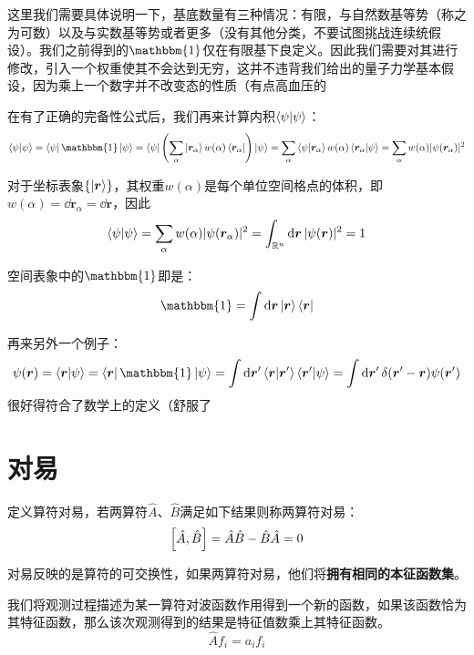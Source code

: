 这里我们需要具体说明一下，基底数量有三种情况：有限，与自然数基等势（称之为可数）以及与实数基等势或者更多（没有其他分类，不要试图挑战连续统假设）。我们之前得到的$\mathbbm{1}$仅在有限基下良定义。因此我们需要对其进行修改，引入一个权重使其不会达到无穷，这并不违背我们给出的量子力学基本假设，因为乘上一个数字并不改变态的性质（有点高血压的

在有了正确的完备性公式后，我们再来计算内积$\bra{\psi}\ket{\psi}$：
\[\bra{\psi}\ket{\psi}=\bra{\psi}\mathbbm{1}\ket{\psi}=\bra{\psi}\left(\sum_{\alpha}\ket{\bm{r}_{\alpha}}w(\alpha)\bra{\bm{r}_{\alpha}}\right)\ket{\psi}=\sum_{\alpha}\bra{\psi}\ket{\bm{r}_{\alpha}}w(\alpha)\bra{\bm{r}_{\alpha}}\ket{\psi}=\sum_{\alpha}w(\alpha)|\psi(\bm{r}_{\alpha})|^2\]

对于坐标表象$\{\ket{\bm{r}}\}$，其权重$w(\alpha)$是每个单位空间格点的体积，即$w(\alpha)=\dd{\bm{r}_{\alpha}}=\dd{\bm{r}}$，因此
\[\bra{\psi}\ket{\psi}=\sum_{\alpha}w(\alpha)|\psi(\bm{r}_{\alpha})|^2=\int_{\mathbb{R}^n}\dd{\bm{r}}|\psi(\bm{r})|^2=1\]

空间表象中的$\mathbbm{1}$即是：
\[\mathbbm{1}=\int\dd{\bm{r}}\ket{\bm{r}}\bra{\bm{r}}\]

再来另外一个例子：
\[\psi(\bm{r})=\bra{\bm{r}}\ket{\psi}=\bra{\bm{r}}\mathbbm{1}\ket{\psi}=\int\dd{\bm{r}'}\bra{\bm{r}}\ket{\bm{r}'}\bra{\bm{r}'}\ket{\psi}=\int\dd{\bm{r}'}\delta(\bm{r}'-\bm{r})\psi(\bm{r}')\]
很好得符合了数学上的定义（舒服了


\section{对易}
定义算符对易，若两算符$\hat{A}$、$\hat{B}$满足如下结果则称两算符对易：
\[\comm{\hat{A}}{\hat{B}}=\hat{A}\hat{B}-\hat{B}\hat{A}=0\]

对易反映的是算符的可交换性，如果两算符对易，他们将\textbf{拥有相同的本征函数集}。

我们将观测过程描述为某一算符对波函数作用得到一个新的函数，如果该函数恰为其特征函数，那么该次观测得到的结果是特征值数乘上其特征函数。
\[\hat{A}f_i=a_if_i\]

